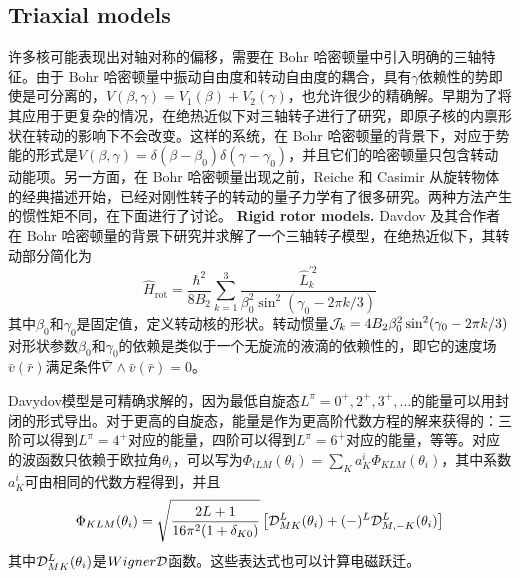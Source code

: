 \subsection{Triaxial models}

许多核可能表现出对轴对称的偏移，需要在 Bohr 哈密顿量中引入明确的三轴特征。由于 Bohr 哈密顿量中振动自由度和转动自由度的耦合，具有$\gamma$依赖性的势即使是可分离的，$V(\beta,\gamma)=V_1(\beta)+V_2(\gamma)$，也允许很少的精确解。早期为了将其应用于更复杂的情况，在绝热近似下对三轴转子进行了研究，即原子核的内禀形状在转动的影响下不会改变。这样的系统，在 Bohr 哈密顿量的背景下，对应于势能的形式是$V(\beta,\gamma)=\delta(\beta-\beta_0)\delta(\gamma-\gamma_0)$，并且它们的哈密顿量只包含转动动能项。另一方面，在 Bohr 哈密顿量出现之前，Reiche 和 Casimir 从旋转物体的经典描述开始，已经对刚性转子的转动的量子力学有了很多研究。两种方法产生的惯性矩不同，在下面进行了讨论。
\vskip 0.6cm
\noindent\textbf{\large Rigid rotor models.}
\vskip 0.3cm
Davdov 及其合作者在 Bohr 哈密顿量的背景下研究并求解了一个三轴转子模型，在绝热近似下，其转动部分简化为
\begin{equation}\label{eq_34}
\hat{H}_\textrm{rot}=\frac{\hbar^2}{8B_2}\sum_{k=1}^3\frac{\hat{L}^{\prime2}_k}{\beta_0^2\sin^2(\gamma_0-2\pi k/3)}
\end{equation}
其中$\beta_0$和$\gamma_0$是固定值，定义转动核的形状。转动惯量${\cal J}_k=4B_2\beta_0^2\sin^2(\gamma_0-2\pi k/3)$对形状参数$\beta_0$和$\gamma_0$的依赖是类似于一个无旋流的液滴的依赖性的，即它的速度场$\bar{v}(\bar{r})$满足条件$\bar{\nabla}\wedge\bar{v}(\bar{r})=0$。

Davydov模型是可精确求解的，因为最低自旋态$L^\pi=0^+,2^+,3^+,\dots$的能量可以用封闭的形式导出。对于更高的自旋态，能量是作为更高阶代数方程的解来获得的：三阶可以得到$L^\pi=4^+$对应的能量，四阶可以得到$L^\pi=6^+$对应的能量，等等。对应的波函数只依赖于欧拉角$\theta_i$，可以写为$\Phi_{iLM}(\theta_i)=\sum_Ka_K^i\Phi_{KLM}(\theta_i)$，其中系数$a_K^i$可由相同的代数方程得到，并且
\begin{equation*}
\Phi_{KLM}(\theta_i)=\sqrt{\frac{2L+1}{16\pi^2(1+\delta_{K0})}}\left[{\cal D}_{MK}^L(\theta_i)+(-)^L{\cal D}_{M,-K}^L(\theta_i)\right]
\end{equation*}
其中${\cal D}^L_{MK}(\theta_i)$是$ Wigner {\cal D}$函数。这些表达式也可以计算电磁跃迁。

